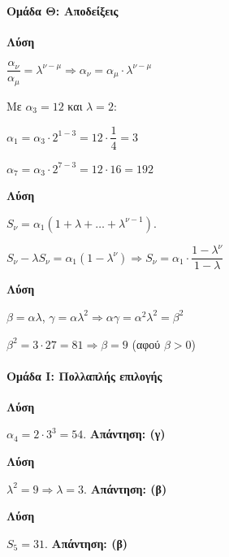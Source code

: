 \documentclass[11pt,a4paper,modern]{FFExercises}
\begin{document}

\paragraph{Ομάδα Θ: Αποδείξεις}

\askhsh
\textbf{Λύση}
\begin{alist}
  \item $\dfrac{\alpha_\nu}{\alpha_\mu} = \lambda^{\nu-\mu} \Rightarrow \alpha_\nu = \alpha_\mu \cdot \lambda^{\nu-\mu}$
  
  \item Με $\alpha_3 = 12$ και $\lambda = 2$:
  
  $\alpha_1 = \alpha_3 \cdot 2^{1-3} = 12 \cdot \dfrac{1}{4} = 3$
  
  $\alpha_7 = \alpha_3 \cdot 2^{7-3} = 12 \cdot 16 = 192$
\end{alist}

\askhsh
\textbf{Λύση}

$S_\nu = \alpha_1(1 + \lambda + \ldots + \lambda^{\nu-1})$.

$S_\nu - \lambda S_\nu = \alpha_1(1 - \lambda^\nu) \Rightarrow S_\nu = \alpha_1 \cdot \dfrac{1 - \lambda^\nu}{1 - \lambda}$

\askhsh
\textbf{Λύση}
\begin{alist}
  \item $\beta = \alpha\lambda$, $\gamma = \alpha\lambda^2 \Rightarrow \alpha\gamma = \alpha^2\lambda^2 = \beta^2$
  
  \item $\beta^2 = 3 \cdot 27 = 81 \Rightarrow \beta = 9$ (αφού $\beta > 0$)
\end{alist}


\paragraph{Ομάδα Ι: Πολλαπλής επιλογής}

\askhsh
\textbf{Λύση}

$\alpha_4 = 2 \cdot 3^3 = 54$. \textbf{Απάντηση: (γ)}

\askhsh
\textbf{Λύση}

$\lambda^2 = 9 \Rightarrow \lambda = 3$. \textbf{Απάντηση: (β)}

\askhsh
\textbf{Λύση}

$S_5 = 31$. \textbf{Απάντηση: (β)}
\end{document}
